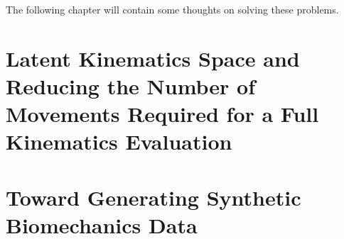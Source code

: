 The following chapter will contain some thoughts on solving these problems.

\section{Latent Kinematics Space and Reducing the Number of Movements Required for a Full Kinematics Evaluation}
\label{sec:latent-kinematics-space}



\section{Toward Generating Synthetic Biomechanics Data}
\label{sec:synthetic-biomechanics-data}





